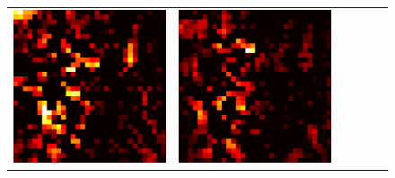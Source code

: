 \documentclass[preprint,12pt]{elsarticle}
\begin{document}
\begin{figure}[p]
\begin{tabular}{cccccc}
  \includegraphics[scale=\scale]{../visualizations/examples/cifar10/cnn/active_saliency_map/2.png} & 
  \includegraphics[scale=\scale]{../visualizations/examples/cifar10/cnn/inactive_saliency_map/2.png} \\
  

\end{tabular}
\end{figure}
\end{document}
